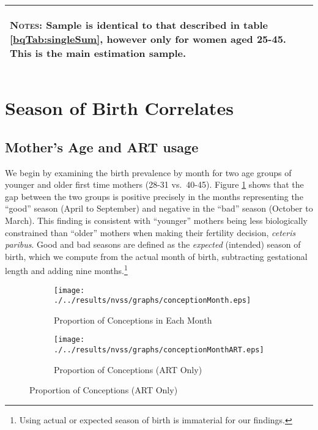 \documentclass[a4paper, 11.5 pt]{article}
\theoremstyle{plain}
\begin{document}
\begin{doublespace}
\begin{table}[htpb!]
\begin{center}
\begin{tabular}{lccccc}
\midrule\multicolumn{6}{p{12.8cm}}{\begin{footnotesize}\textsc{Notes:} Sample is identical to that described in table \ref{bqTab:singleSum}, however only for women aged 25-45.  This  is the main estimation sample.                                    \end{footnotesize}} \\ \bottomrule
 \end{tabular}\end{center}\end{table}



\newpage
\section{Season of Birth Correlates}
\label{scn:results}
\subsection{Mother's Age and ART usage}
We begin by examining the birth prevalence by month for two age groups of younger and older first time mothers (28-31 vs.\ 40-45). Figure \ref{fig:concepAbs} shows that the gap between the two groups is positive precisely in the months representing the ``good'' season (April to September) and negative in the ``bad'' season (October to March). This finding is consistent with ``younger'' mothers being less biologically constrained than ``older'' mothers when making their fertility decision, \emph{ceteris paribus}. Good and bad seasons are defined as the \emph{expected} (intended) season of birth, which we compute from the actual month of birth, subtracting gestational length and adding nine months.\footnote{ Using actual or expected season of birth is immaterial for our findings.}

\begin{figure}[htpb!]
\begin{center}
\caption{Birth Prevalence by Month, Age Group, and ART Usage}
\label{bqFig:concepMonth}
\begin{subfigure}{.5\textwidth}
  \centering
  \texttt{[image: ./../results/nvss/graphs/conceptionMonth.eps]}
  \caption{Proportion of Conceptions in Each Month}
  \label{fig:concepAbs}
\end{subfigure}%
\begin{subfigure}{.5\textwidth}
  \centering
  \texttt{[image: ./../results/nvss/graphs/conceptionMonthART.eps]}
  \caption{Proportion of Conceptions (ART Only)}
  \label{fig:concepAbsART}
\end{subfigure}
\end{center}
\end{figure}


\end{doublespace}
\end{document}
